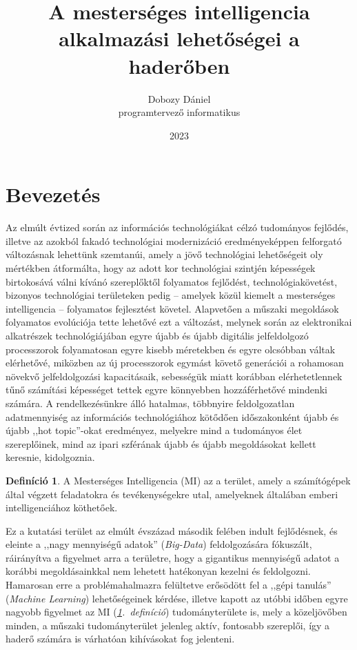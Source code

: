 \documentclass[
]{thesis-ekf}
\theoremstyle{definition}
\newtheorem{definicio}[tetel]{Definíció}
\theoremstyle{remark}
\begin{document}
	\title{A mesterséges intelligencia alkalmazási lehetőségei a haderőben}
	\author{Dobozy Dániel\\programtervező informatikus}
	\date{2023}
	\maketitle
	\tableofcontents
	
	
	\chapter*{Bevezetés}
	
	Az elmúlt évtized során az információs technológiákat célzó tudományos fejlődés, illetve az azokból fakadó technológiai modernizáció eredményeképpen felforgató változásnak lehettünk szemtanúi, amely a jövő technológiai lehetőségeit oly mértékben átformálta, hogy az adott kor technológiai szintjén képességek birtokosává válni kívánó szereplőktől folyamatos fejlődést, technológiakövetést, bizonyos technológiai területeken pedig -- amelyek közül kiemelt a mesterséges intelligencia -- folyamatos fejlesztést követel. Alapvetően a műszaki megoldások folyamatos evolúciója tette lehetővé ezt a változást, melynek során az elektronikai alkatrészek technológiájában egyre újabb és újabb digitális jelfeldolgozó processzorok folyamatosan egyre kisebb méretekben és egyre olcsóbban váltak elérhetővé, miközben az új processzorok egymást követő generációi a rohamosan növekvő jelfeldolgozási kapacitásaik, sebességük miatt korábban elérhetetlennek tűnő számítási képességet tettek egyre könnyebben hozzáférhetővé mindenki számára. A rendelkezésünkre álló hatalmas, többnyire feldolgozatlan adatmennyiség az információs technológiához kötődően időszakonként újabb és újabb ,,hot topic''-okat eredményez, melyekre mind a tudományos élet szereplőinek, mind az ipari szférának újabb és újabb megoldásokat kellett keresnie, kidolgoznia.
	
	\begin{definicio}\label{def:ai}
		A Mesterséges Intelligencia (MI) az a terület, amely a számítógépek által végzett feladatokra és tevékenységekre utal, amelyeknek általában emberi intelligenciához köthetőek.
	\end{definicio}
	
	Ez a kutatási terület az elmúlt évszázad második felében indult fejlődésnek, és eleinte a ,,nagy mennyiségű adatok'' (\emph{Big-Data}) feldolgozására fókuszált, ráirányítva a figyelmet arra a területre, hogy a gigantikus mennyiségű adatot a korábbi megoldásainkkal nem lehetett hatékonyan kezelni és feldolgozni. Hamarosan erre a problémahalmazra felültetve erősödött fel a ,,gépi tanulás'' (\emph{Machine Learning}) lehetőségeinek kérdése, illetve kapott az utóbbi időben egyre nagyobb figyelmet az MI (\Az \emph{\ref{def:ai}.~definíció}) tudományterülete is, mely a közeljövőben minden, a műszaki tudományterület jelenleg aktív, fontosabb szereplői, így a haderő számára is várhatóan kihívásokat fog jelenteni.
	
\end{document}
